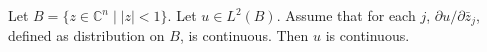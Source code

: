 
Let $B = \{z \in \mathbb{C}^n \mid |z| < 1\}$. Let $u \in L^2(B)$. Assume that for each $j$, $\partial u / \partial \bar{z}_j$, defined as distribution on $B$, is continuous. Then $u$ is continuous.
